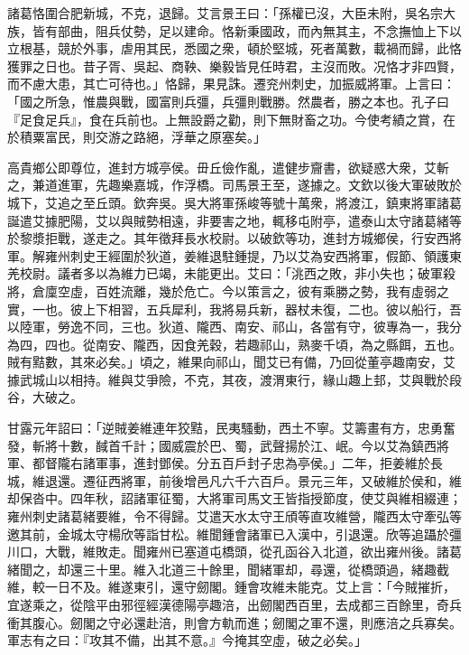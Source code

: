 \begin{pinyinscope}
 
 
 
 諸葛恪圍合肥新城，不克，退歸。艾言景王曰：「孫權已沒，大臣未附，吳名宗大族，皆有部曲，阻兵仗勢，足以建命。恪新秉國政，而內無其主，不念撫恤上下以立根基，競於外事，虐用其民，悉國之衆，頓於堅城，死者萬數，載禍而歸，此恪獲罪之日也。昔子胥、吳起、商鞅、樂毅皆見任時君，主沒而敗。况恪才非四賢，而不慮大患，其亡可待也。」恪歸，果見誅。遷兖州刺史，加振威將軍。上言曰：「國之所急，惟農與戰，國富則兵彊，兵彊則戰勝。然農者，勝之本也。孔子曰『足食足兵』，食在兵前也。上無設爵之勸，則下無財畜之功。今使考績之賞，在於積粟富民，則交游之路絕，浮華之原塞矣。」
 
 
 
 
 高貴鄉公即尊位，進封方城亭侯。毌丘儉作亂，遣健步齎書，欲疑惑大衆，艾斬之，兼道進軍，先趣樂嘉城，作浮橋。司馬景王至，遂據之。文欽以後大軍破敗於城下，艾追之至丘頭。欽奔吳。吳大將軍孫峻等號十萬衆，將渡江，鎮東將軍諸葛誕遣艾據肥陽，艾以與賊勢相遠，非要害之地，輒移屯附亭，遣泰山太守諸葛緒等於黎漿拒戰，遂走之。其年徵拜長水校尉。以破欽等功，進封方城鄉侯，行安西將軍。解雍州刺史王經圍於狄道，姜維退駐鍾提，乃以艾為安西將軍，假節、領護東羌校尉。議者多以為維力已竭，未能更出。艾曰：「洮西之敗，非小失也；破軍殺將，倉廩空虛，百姓流離，幾於危亡。今以策言之，彼有乘勝之勢，我有虛弱之實，一也。彼上下相習，五兵犀利，我將易兵新，器杖未復，二也。彼以船行，吾以陸軍，勞逸不同，三也。狄道、隴西、南安、祁山，各當有守，彼專為一，我分為四，四也。從南安、隴西，因食羌穀，若趣祁山，熟麥千頃，為之縣餌，五也。賊有黠數，其來必矣。」頃之，維果向祁山，聞艾已有備，乃回從董亭趣南安，艾據武城山以相持。維與艾爭險，不克，其夜，渡渭東行，緣山趣上邽，艾與戰於段谷，大破之。
 
 
 
 
 甘露元年詔曰：「逆賊姜維連年狡黠，民夷騷動，西土不寧。艾籌畫有方，忠勇奮發，斬將十數，馘首千計；國威震於巴、蜀，武聲揚於江、岷。今以艾為鎮西將軍、都督隴右諸軍事，進封鄧侯。分五百戶封子忠為亭侯。」二年，拒姜維於長城，維退還。遷征西將軍，前後增邑凡六千六百戶。景元三年，又破維於侯和，維却保沓中。四年秋，詔諸軍征蜀，大將軍司馬文王皆指授節度，使艾與維相綴連；雍州刺史諸葛緒要維，令不得歸。艾遣天水太守王頎等直攻維營，隴西太守牽弘等邀其前，金城太守楊欣等詣甘松。維聞鍾會諸軍已入漢中，引退還。欣等追躡於彊川口，大戰，維敗走。聞雍州已塞道屯橋頭，從孔函谷入北道，欲出雍州後。諸葛緒聞之，却還三十里。維入北道三十餘里，聞緒軍却，尋還，從橋頭過，緒趣截維，較一日不及。維遂東引，還守劒閣。鍾會攻維未能克。艾上言：「今賊摧折，宜遂乘之，從陰平由邪徑經漢德陽亭趣涪，出劒閣西百里，去成都三百餘里，奇兵衝其腹心。劒閣之守必還赴涪，則會方軌而進；劒閣之軍不還，則應涪之兵寡矣。軍志有之曰：『攻其不備，出其不意。』今掩其空虛，破之必矣。」
 

\end{pinyinscope}
